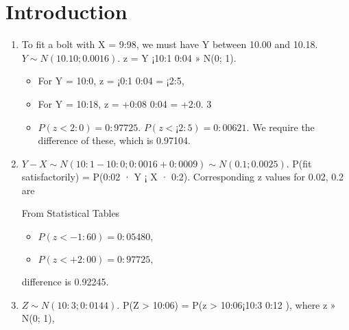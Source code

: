 \documentclass[a4paper,12pt]{article}
\begin{document}
\section{Introduction}
\begin{enumerate}
\item To fit a bolt with X = 9:98, we must have Y between 10.00 and 10.18.
$Y \sim N(10.10; 0.0016)$. z = Y ¡10:1
0:04 » N(0; 1).
\begin{itemize}
    \item For Y = 10:0, z = ¡0:1
0:04 = ¡2:5,
\item For Y = 10:18, z = +0:08
0:04 = +2:0.
3
\item $P(z < 2:0) = 0:97725$. $P(z < ¡2:5) = 0:00621$.
We require the difference of these, which is 0.97104.
\end{itemize}

\item  $Y - X \sim N(10:1 - 10:0; 0:0016 + 0:0009) \sim N(0.1; 0.0025).$
P(fit satisfactorily) = P(0:02 · Y ¡ X · 0:2). Corresponding z values for
0.02, 0.2 are 
From Statistical Tables

\begin{itemize}
\item $P(z < -1:60) = 0:05480,$
\item $P(z < +2:00) = 0:97725,$
\end{itemize}
difference is 0.92245.
\item  $Z \sim N(10:3; 0:0144)$. P(Z > 10:06) = P(z > 10:06¡10:3
0:12 ), where z » N(0; 1),


\end{enumerate}
\end{document}
